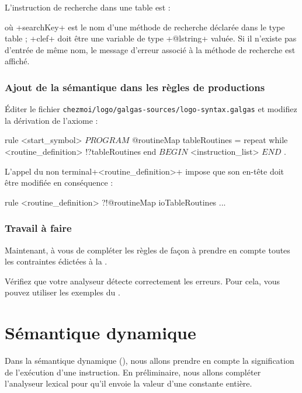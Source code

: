L'instruction de recherche dans une table est :
\begin{galgas}
\end{galgas}
où \ggs+searchKey+ est le nom d'une méthode de recherche déclarée dans le type table ; \ggs+clef+ doit être une variable de type \ggs+@lstring+ valuée. Si il n'existe pas d'entrée de même nom, le message d'erreur associé à la méthode de recherche est affiché.

\subsubsection{Ajout de la sémantique dans les règles de productions}
Éditer le fichier \texttt{chezmoi/logo/galgas-sources/logo-syntax.galgas} et modifiez la dérivation de l'axiome :

\begin{galgas}
rule <start_symbol> {
  $PROGRAM$
  @routineMap tableRoutines = {}
  repeat
  while 
    <routine_definition> !?tableRoutines
  end
  $BEGIN$
  <instruction_list>
  $END$
  $.$
}
\end{galgas}

L'appel du non terminal\ggs+<routine_definition>+ impose que son en-tête doit être modifiée en conséquence :
\begin{galgas}
rule <routine_definition> ?!@routineMap ioTableRoutines {
  ...
}
\end{galgas}

\subsubsection{Travail à faire}
Maintenant, à vous de compléter les règles de façon à prendre en compte toutes les contraintes édictées à la .

Vérifiez que votre analyseur détecte correctement les erreurs. Pour cela, vous pouvez utiliser les exemples du .




\section{Sémantique dynamique}

Dans la sémantique dynamique (), nous allons prendre en compte la signification de l'exécution d'une instruction. En préliminaire, nous allons compléter l'analyseur lexical pour qu'il envoie la valeur d'une constante entière.

